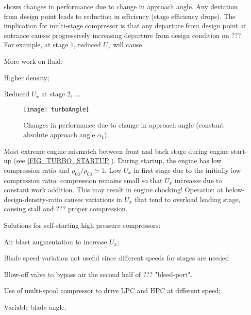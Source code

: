  shows changes in performance due to change in approach angle. Any deviation from design point leads to reduction in efficiency (stage efficiency drops). The implication for multi-stage compressor is that any departure from design point at entrance causes progressively increasing departure from design condition on ???. For example, at stage 1, reduced $U_x$ will cause
\begin{itemizePacked}
\item More work on fluid;
\item Higher density;
\item Reduced $U_x$ at stage 2, $\dots$
\end{itemizePacked}

\begin{figure}[!htb!]
 \centering
    {\texttt{[image: turboAngle]}}
    \caption{\label{FIG_TURBO_ANGLE}Changes in performance due to change in approach angle (constant absolute approach angle $\alpha_1$).}
\end{figure}

Most extreme engine mismatch between front and back stage during engine start-up (see \cref{FIG_TURBO_STARTUP}). During startup, the engine has low compression ratio and $\rho_{03}/\rho_{03} \simeq 1$. Low $U_x$ in first stage due to the initially low compression ratio. compression remains small so that $U_x$ increases due to constant work addition. This may result in engine chocking! Operation at below-design-density-ratio causes variations in $U_x$ that tend to overload leading stage, causing stall and ??? proper compression.

Solutions for self-starting high pressure compressors:
\begin{itemizePacked}
\item Air blast augmentation to increase $U_x$;
\item Blade speed variation not useful since different speeds for stages are needed
  \begin{itemizePacked}
  \item Blow-off valve to bypass air the second half of ??? "bleed-port".
  \end{itemizePacked}
\item Use of multi-spool compressor to drive LPC and HPC at different speed;
\item Variable blade angle.
\end{itemizePacked}

